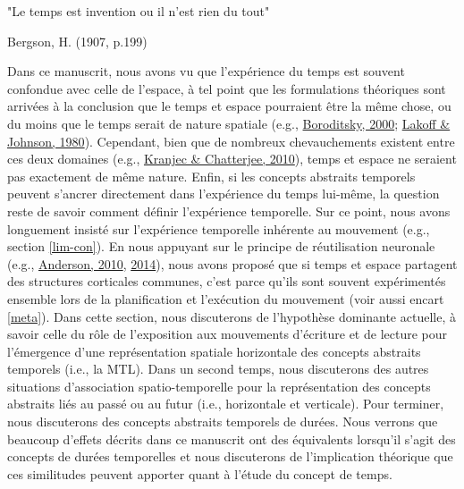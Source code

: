 \documentclass[
  a4paper,12pt,twoside,onecolumn,openright,final,oldfontcommands]{memoir}
\begin{document}
\epigraph{"Le temps est invention ou il n’est rien du tout"} {Bergson, H. (1907, p.199)}

Dans ce manuscrit, nous avons vu que l'expérience du temps est souvent confondue avec celle de l'espace, à tel point que les formulations théoriques sont arrivées à la conclusion que le temps et espace pourraient être la même chose, ou du moins que le temps serait de nature spatiale (e.g., \protect\hyperlink{ref-boroditsky_metaphoric_2000}{Boroditsky, 2000}; \protect\hyperlink{ref-lakoff_metaphors_1980}{Lakoff \& Johnson, 1980}). Cependant, bien que de nombreux chevauchements existent entre ces deux domaines (e.g., \protect\hyperlink{ref-kranjec_are_2010}{Kranjec \& Chatterjee, 2010}), temps et espace ne seraient pas exactement de même nature. Enfin, si les concepts abstraits temporels peuvent s'ancrer directement dans l'expérience du temps lui-même, la question reste de savoir comment définir l'expérience temporelle. Sur ce point, nous avons longuement insisté sur l'expérience temporelle inhérente au mouvement (e.g., section \ref{lim-con}). En nous appuyant sur le principe de réutilisation neuronale (e.g., \protect\hyperlink{ref-anderson_neural_2010}{Anderson, 2010}, \protect\hyperlink{ref-anderson_after_2014}{2014}), nous avons proposé que si temps et espace partagent des structures corticales communes, c'est parce qu'ils sont souvent expérimentés ensemble lors de la planification et l'exécution du mouvement (voir aussi encart \ref{meta}). Dans cette section, nous discuterons de l'hypothèse dominante actuelle, à savoir celle du rôle de l'exposition aux mouvements d'écriture et de lecture pour l'émergence d'une représentation spatiale horizontale des concepts abstraits temporels (i.e., la MTL). Dans un second temps, nous discuterons des autres situations d'association spatio-temporelle pour la représentation des concepts abstraits liés au passé ou au futur (i.e., horizontale et verticale). Pour terminer, nous discuterons des concepts abstraits temporels de durées. Nous verrons que beaucoup d'effets décrits dans ce manuscrit ont des équivalents lorsqu'il s'agit des concepts de durées temporelles et nous discuterons de l'implication théorique que ces similitudes peuvent apporter quant à l'étude du concept de temps.
\end{document}

